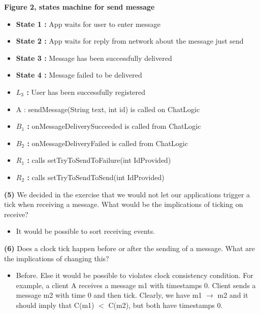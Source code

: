 \documentclass[11pt]{article}
\renewcommand\part[1]{\vspace{.10in}\textbf{(#1)}}
\begin{document}
\textbf{Figure 2, states machine for send message}

\begin{itemize}
	\item \textbf{State 1 : } App waits for user to enter message
	\item \textbf{State 2 : } App waits for reply from network about the message just send
	\item \textbf{State 3 : } Message has been successfully delivered
	\item \textbf{State 4 : } Message failed to be delivered
	\item \textbf{$L_{3}$ : } User has been successfully registered
	\item A : sendMessage(String text, int id) is called on ChatLogic
	\item \textbf{$B_{1}$ : } onMessageDeliverySucceeded is called from ChatLogic
	\item \textbf{$B_{2}$ : } onMessageDeliveryFailed is called from ChatLogic
	\item \textbf{$R_{1}$ : } calls setTryToSendToFailure(int IdProvided)
	\item \textbf{$R_{2}$ : } calls setTryToSendToSend(int IdProvided)
\end{itemize}

\clearpage

\part{5}
We decided in the exercise that we would not let our applications trigger a tick when receiving a
message. What would be the implications of ticking on receive?


\begin{itemize}
	\item It would be possible to sort receiving events.
\end{itemize}

\part{6}
Does a clock tick happen before or after the sending of a message. What are the implications of
changing this?


\begin{itemize}
	\item Before. Else it would be possible to violates clock consistency condition. For example, a client A receives a message m1 with timestamps 0. Client sends a message m2 with time 0 and then tick. Clearly, we have m1 $\rightarrow$ m2 and it should imply that C(m1) $<$ C(m2), but both have timestamps 0.

\end{itemize}
\end{document}
